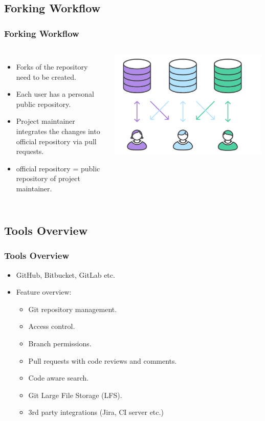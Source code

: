 \subsection[]{Forking Workflow}
\begin{frame}
\frametitle{Forking Workflow}
\begin{columns}
		\begin{itemize}
		\item Forks of the repository need to be created.
		\item Each user has a personal public repository.
		\item Project maintainer integrates the changes into official repository via pull requests.
		\item official repository = public repository of project maintainer.
		\end{itemize}
		\includegraphics[width=\textwidth, height=0.68\textwidth]{forking-workflow.png}
\end{columns}
\end{frame}

\subsection[]{Tools Overview}
\begin{frame}
\frametitle{Tools Overview}
\begin{itemize}
	\item GitHub, Bitbucket, GitLab etc.
	\item Feature overview:
		\begin{itemize}
		\item Git repository management.
		\item Access control.
		\item Branch permissions.
		\item Pull requests with code reviews and comments.
		\item Code aware search.
		\item Git Large File Storage (LFS).
		\item 3rd party integrations (Jira, CI server etc.)
		\end{itemize}
\end{itemize}
\end{frame}
